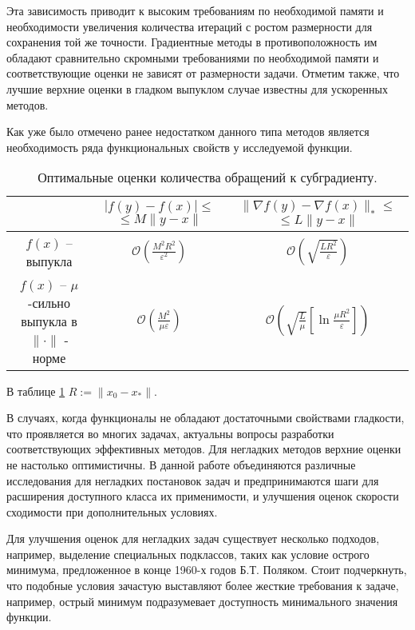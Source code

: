 Эта зависимость приводит к высоким требованиям по необходимой памяти и необходимости увеличения количества итераций с ростом размерности для сохранения той же точности. Градиентные методы в противоположность им обладают сравнительно скромными требованиями по необходимой памяти и соответствующие оценки не зависят от размерности задачи. Отметим также, что лучшие верхние оценки в гладком выпуклом случае известны для ускоренных методов. \cite{Nesterov1983} 

Как уже было отмечено ранее недостатком данного типа методов является необходимость ряда функциональных свойств у исследуемой функции. 

\begin{table}[h]
    \caption{Оптимальные оценки количества обращений к субградиенту.}
    \label{est_tbl}
    \centering
    \begin{tabular}{|c|c|c|}
        \hline
         & \makecell{$|f(y) - f(x)| \leq$ \\ $\leq M \| y - x \|$} & \makecell{$\|\nabla f(y) - \nabla f(x)\|_* \leq $\\ $\leq L \| y - x \|$} \\
        \hline
        $f(x)$ -- выпукла & $\mathcal{O} \left( \frac{M^2 R^2}{\varepsilon^2} \right)$ & $\mathcal{O} \left( \sqrt{\frac{L R^2}{\varepsilon}} \right)$ \\
        \hline
        \makecell{$f(x)$ -- $\mu$-сильно \\ выпукла в $\| \cdot \|$ - норме} & $\mathcal{O} \left( \frac{M^2}{\mu \varepsilon} \right)$ & $\mathcal{O} \left( \sqrt{\frac{L}{\mu}} \left[\ln{\frac{\mu R^2}{\varepsilon}}\right] \right)$ \\
        \hline
    \end{tabular}
\end{table}
В таблице \ref{est_tbl} $R := \|x_0 - x_*\| $. 

В случаях, когда функционалы не обладают достаточными свойствами гладкости, что проявляется во многих задачах, актуальны вопросы разработки соответствующих эффективных методов. Для негладких методов верхние оценки не настолько оптимистичны. В данной работе объединяются различные исследования для негладких постановок задач и предпринимаются шаги для расширения доступного класса их применимости, и улучшения оценок скорости сходимости при дополнительных условиях. 

Для улучшения оценок для негладких задач существует несколько подходов, например, выделение специальных подклассов, таких как условие острого минимума, предложенное в конце 1960-х годов Б.Т. Поляком. Стоит подчеркнуть, что подобные условия зачастую выставляют более жесткие требования к задаче, например, острый минимум подразумевает доступность минимального значения функции. 

